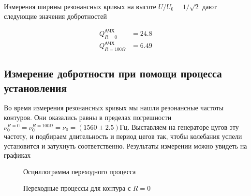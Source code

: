 \documentclass{article}
\begin{document}
\newpage
Измерения ширины резонансных кривых на высоте $U/U_0=1/\sqrt{2}$ дают следующие значения
добротностей

\begin{equation}
    \begin{aligned}
        Q_{R=0}^{АЧХ}&=24.8\\
        Q_{R=100\Omega}^{АЧХ}&=6.49
    \end{aligned}
\end{equation}

\subsection{Измерение добротности при помощи процесса установления}\label{mes_perexod}
Во время измерения резонансных кривых мы нашли резонансные частоты контуров. Они
оказались равны в пределах погрешности
$\nu_0^{R=0}=\nu_0^{R=100\Omega}=\nu_0=(1560 \pm 2.5)Гц$. Выставляем на генераторе цугов
эту частоту, и подбираем длительность и период цегов так, чтобы колебания успели
установится и затухнуть соответственно. Результаты измерении можно увидеть на графиках

\begin{figure}[h]
    \caption{Осциллограмма переходного процесса}\label{fig:perexod_oscilloscope}
    \newpage
\end{figure}

\begin{figure}[h]
    \caption{Переходные процессы для контура с $R=0$}\label{fig:perexod_R_0}
    \newpage
\end{figure}
\end{document}
